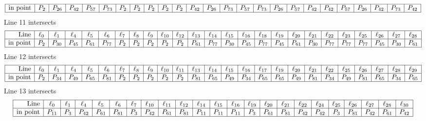 \documentclass{article}
\begin{document}
{$$\begin{array}{|r*{24}{|c}|}
\hline
\mbox{in point}  & P_{2} & P_{26} & P_{42} & P_{57} & P_{73} & P_{2} & P_{2} & P_{2} & P_{2} & P_{2} & P_{42} & P_{26} & P_{73} & P_{57} & P_{73} & P_{26} & P_{57} & P_{42} & P_{42} & P_{57} & P_{26} & P_{42} & P_{73} & P_{42}\\
\hline
\end{array}
$$
Line 11 intersects 
$$
\begin{array}{|r*{24}{|c}|}
\hline
\mbox{Line}  & \ell_{0} & \ell_{1} & \ell_{4} & \ell_{5} & \ell_{6} & \ell_{7} & \ell_{8} & \ell_{9} & \ell_{10} & \ell_{12} & \ell_{13} & \ell_{14} & \ell_{15} & \ell_{16} & \ell_{18} & \ell_{19} & \ell_{20} & \ell_{21} & \ell_{22} & \ell_{23} & \ell_{25} & \ell_{26} & \ell_{27} & \ell_{28}\\
\hline
\mbox{in point}  & P_{2} & P_{30} & P_{45} & P_{61} & P_{77} & P_{2} & P_{2} & P_{2} & P_{2} & P_{2} & P_{61} & P_{77} & P_{30} & P_{45} & P_{77} & P_{45} & P_{61} & P_{30} & P_{77} & P_{77} & P_{77} & P_{45} & P_{30} & P_{61}\\
\hline
\end{array}
$$
Line 12 intersects 
$$
\begin{array}{|r*{24}{|c}|}
\hline
\mbox{Line}  & \ell_{0} & \ell_{1} & \ell_{4} & \ell_{5} & \ell_{6} & \ell_{7} & \ell_{8} & \ell_{9} & \ell_{10} & \ell_{11} & \ell_{13} & \ell_{14} & \ell_{15} & \ell_{16} & \ell_{17} & \ell_{19} & \ell_{20} & \ell_{21} & \ell_{22} & \ell_{25} & \ell_{26} & \ell_{27} & \ell_{28} & \ell_{29}\\
\hline
\mbox{in point}  & P_{2} & P_{34} & P_{49} & P_{65} & P_{81} & P_{2} & P_{2} & P_{2} & P_{2} & P_{2} & P_{81} & P_{65} & P_{49} & P_{34} & P_{65} & P_{65} & P_{49} & P_{81} & P_{34} & P_{49} & P_{81} & P_{65} & P_{34} & P_{65}\\
\hline
\end{array}
$$
Line 13 intersects 
$$
\begin{array}{|r*{22}{|c}|}
\hline
\mbox{Line}  & \ell_{0} & \ell_{1} & \ell_{4} & \ell_{5} & \ell_{6} & \ell_{7} & \ell_{10} & \ell_{11} & \ell_{12} & \ell_{14} & \ell_{15} & \ell_{16} & \ell_{19} & \ell_{20} & \ell_{21} & \ell_{22} & \ell_{24} & \ell_{25} & \ell_{26} & \ell_{27} & \ell_{28} & \ell_{30}\\
\hline
\mbox{in point}  & P_{11} & P_{3} & P_{42} & P_{61} & P_{81} & P_{3} & P_{42} & P_{61} & P_{81} & P_{11} & P_{11} & P_{11} & P_{3} & P_{61} & P_{81} & P_{42} & P_{42} & P_{3} & P_{81} & P_{42} & P_{61} & P_{42}\\
\hline
\end{array}
$$}
\end{document}
